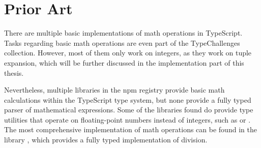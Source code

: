 \section{Prior Art}

There are multiple basic implementations of math operations in TypeScript. Tasks regarding basic math operations are even part of the TypeChallenges collection\cite{TypechallengesTypechallenges2023}. However, most of them only work on integers, as they work on tuple expansion, which will be further discussed in the implementation part of this thesis.

Nevertheless, multiple libraries in the \acrshort{npm} registry provide basic math calculations within the TypeScript type system, but none provide a fully typed parser of mathematical expressions. Some of the libraries found do provide type utilities that operate on floating-point numbers instead of integers, such as  \cite{sorhusSindresorhusTypefest2023} or \cite{kawayilinlinKawayiLinLinTypescriptlodash2023}. The most comprehensive implementation of math operations can be found in the  library \cite{arielTypeLevelArithmetic2023}, which provides a fully typed implementation of division.

